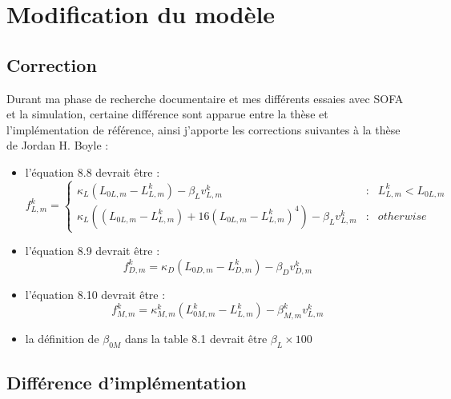 \chapter{Modification du modèle} %
\label{cha:Modification du modèle}

\section{Correction} %
\label{sec:Correction}

Durant ma phase de recherche documentaire et mes différents essaies avec
SOFA et la simulation, certaine différence sont apparue entre la thèse
et l'implémentation de référence, ainsi j'apporte les corrections suivantes
à la thèse de Jordan H. Boyle \cite{Boyle2009} :
\begin{itemize}
   \item l'équation 8.8 devrait être :
      \begin{equation}
      f^k_{L,m} = \left\{ 
         \begin{array}{rcl}
            \kappa_L(L_{0L,m} - L_{L,m}^k) - \beta_{L}v_{L,m}^k & : & L_{L,m}^k < L_{0L,m}\\
            \kappa_L((L_{0L,m} - L_{L,m}^k) + 16(L_{0L,m} - L_{L,m}^k)^4) - \beta_{L}v_{L,m}^k & : & otherwise
         \end{array}
         \right.
      \end{equation}
   \item l'équation 8.9 devrait être :
      \begin{equation}
      f_{D,m}^k = \kappa_D(L_{0D,m} - L_{D,m}^k) - \beta_{D}v_{D,m}^k
      \end{equation}
   \item l'équation 8.10 devrait être :
      \begin{equation}
      f_{M,m}^k = \kappa_{M,m}^k(L_{0M,m}^k - L_{L,m}^k) - \beta_{M,m}^{k}v_{L,m}^k
      \end{equation}
   \item la définition de $\beta_{0M}$ dans la table 8.1 devrait être $\beta_L \times 100$
\end{itemize}


\section{Différence d'implémentation} %
\label{sec:Différence d'implémentation}

